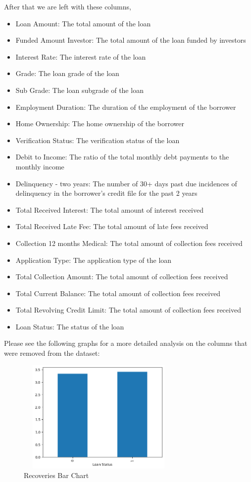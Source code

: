 \documentclass[sigplan]{acmart}
\begin{document}
After that we are left with these columns,
\begin{itemize}
    \item Loan Amount: The total amount of the loan
    \item Funded Amount Investor: The total amount of the loan funded by investors
    \item Interest Rate: The interest rate of the loan
    \item Grade: The loan grade of the loan
    \item Sub Grade: The loan subgrade of the loan
    \item Employment Duration: The duration of the employment of the borrower
    \item Home Ownership: The home ownership of the borrower
    \item Verification Status: The verification status of the loan
    \item Debit to Income: The ratio of the total monthly debt payments to the monthly income
    \item Delinquency - two years: The number of 30+ days past due incidences of delinquency in the borrower's credit file for the past 2 years
    \item Total Received Interest: The total amount of interest received
    \item Total Received Late Fee: The total amount of late fees received
    \item Collection 12 months Medical: The total amount of collection fees received
    \item Application Type: The application type of the loan
    \item Total Collection Amount: The total amount of collection fees received
    \item Total Current Balance: The total amount of collection fees received
    \item Total Revolving Credit Limit: The total amount of collection fees received
    \item Loan Status: The status of the loan
\end{itemize}

Please see the following graphs for a more detailed analysis on the columns that were removed from the dataset:

\begin{figure}[h]
    \centering
    \includegraphics[width=8cm, height = 5.5cm]{images/recoveries.png}
    \caption{Recoveries Bar Chart}
\end{figure}
\end{document}
